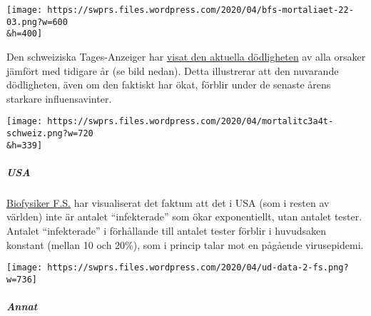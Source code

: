 \texttt{[image: https://swprs.files.wordpress.com/2020/04/bfs-mortaliaet-22-03.png?w=600\\\&h=400]}

Den schweiziska Tages-Anzeiger har
\href{https://interaktiv.tagesanzeiger.ch/2020/uebersterblichkeit-wegen-coronavirus/}{visat
den aktuella dödligheten} av alla orsaker jämfört med tidigare år (se
bild nedan). Detta illustrerar att den nuvarande dödligheten, även om
den faktiskt har ökat, förblir under de senaste årens starkare
influensavinter.

\texttt{[image: https://swprs.files.wordpress.com/2020/04/mortalitc3a4t-schweiz.png?w=720\\\&h=339]}

\hypertarget{usa}{%
\subparagraph{\texorpdfstring{\textbf{USA}}{USA}}\label{usa}}

\href{https://swprs.org/rate-of-positive-covid19-tests/}{Biofysiker
F.S.} har visualiserat det faktum att det i USA (som i resten av
världen) inte är antalet ``infekterade'' som ökar exponentiellt, utan
antalet tester. Antalet ``infekterade'' i förhållande till antalet
tester förblir i huvudsaken konstant (mellan 10 och 20\%), som i princip
talar mot en pågående virusepidemi.

\texttt{[image: https://swprs.files.wordpress.com/2020/04/ud-data-2-fs.png?w=736]}

\hypertarget{annat}{%
\subparagraph{\texorpdfstring{\textbf{Annat}}{Annat}}\label{annat}}

